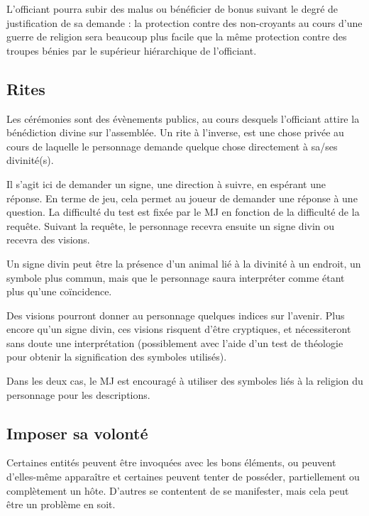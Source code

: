 \documentclass[10pt,a4paper,twocolumn]{book}
\begin{document}
L'officiant pourra subir des malus ou bénéficier de bonus suivant le degré de justification de sa demande : la protection contre des non-croyants au cours d'une guerre de religion sera beaucoup plus facile que la même protection contre des troupes bénies par le supérieur hiérarchique de l'officiant.

\subsection{Rites}
Les cérémonies sont des évènements publics, au cours desquels l'officiant attire la bénédiction divine sur l'assemblée. Un rite à l'inverse, est une chose privée au cours de laquelle le personnage demande quelque chose directement à sa/ses divinité(s).

Il s'agit ici de demander un signe, une direction à suivre, en espérant une réponse. En terme de jeu, cela permet au joueur de demander une réponse à une question. La difficulté du test est fixée par le MJ en fonction de la difficulté de la requête. 
Suivant la requête, le personnage recevra ensuite un signe divin ou recevra des visions.

Un signe divin peut être la présence d'un animal lié à la divinité à un endroit, un symbole plus commun, mais que le personnage saura interpréter comme étant plus qu'une coïncidence.

Des visions pourront donner au personnage quelques indices sur l'avenir. Plus encore qu'un signe divin, ces visions risquent d'être cryptiques, et nécessiteront sans doute une interprétation (possiblement avec l'aide d'un test de théologie pour obtenir la signification des symboles utilisés).

Dans les deux cas, le MJ est encouragé à utiliser des symboles liés à la religion du personnage pour les descriptions.
\subsection{Imposer sa volonté}
Certaines entités peuvent être invoquées avec les bons éléments, ou peuvent d'elles-même apparaître et certaines peuvent tenter de posséder, partiellement ou complètement un hôte. D'autres se contentent de se manifester, mais cela peut être un problème en soit. 
\end{document}

